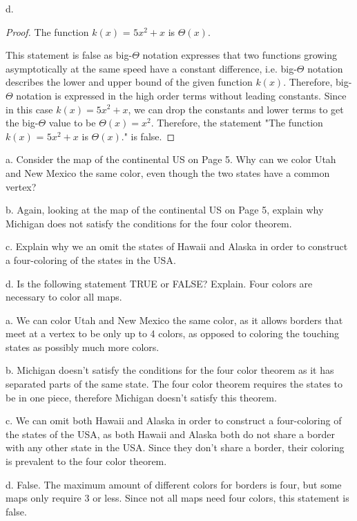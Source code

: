 \documentclass{article}
\begin{document}
\item[]d. 
    \begin{proof}
        \caption{The function $k(x)$ = $5x^{2} + x$ is $\Theta(x)$.}
            \item[]This statement is false as big-$\Theta$ notation expresses that two functions growing asymptotically at the same speed have a constant difference, i.e. big-$\Theta$ notation describes the lower and upper bound of the given function $k(x)$. Therefore, big-$\Theta$ notation is expressed in the high order terms without leading constants. Since in this case $k(x) = 5x^{2} + x$, we can drop the constants and lower terms to get the big-$\Theta$ value to be $\Theta(x) = x^{2}$. Therefore, the statement "The function $k(x)$ = $5x^{2} + x$ is $\Theta(x)$." is false. 
    \end{proof}

\clearpage
\header
\item[]a. Consider the map of the continental US on Page 5. Why can we color Utah and New Mexico the same color, even though the two states have a common vertex?
\item[]b. Again, looking at the map of the continental US on Page 5, explain why Michigan does not satisfy the conditions for the four color theorem.
\item[]c. Explain why we an omit the states of Hawaii and Alaska in order to construct a four-coloring of the states in the USA.
\item[]d. Is the following statement TRUE or FALSE? Explain. Four colors are necessary to color all maps.
\item[]
\item[]a. We can color Utah and New Mexico the same color, as it allows borders that meet at a vertex to be only up to 4 colors, as opposed to coloring the touching states as possibly much more colors.
\item[]b. Michigan doesn't satisfy the conditions for the four color theorem as it has separated parts of the same state. The four color theorem requires the states to be in one piece, therefore Michigan doesn't satisfy this theorem.
\item[]c. We can omit both Hawaii and Alaska in order to construct a four-coloring of the states of the USA, as both Hawaii and Alaska both do not share a border with any other state in the USA. Since they don't share a border, their coloring is prevalent to the four color theorem.
\item[]d. False. The maximum amount of different colors for borders is four, but some maps only require 3 or less. Since not all maps need four colors, this statement is false.
\end{document}

